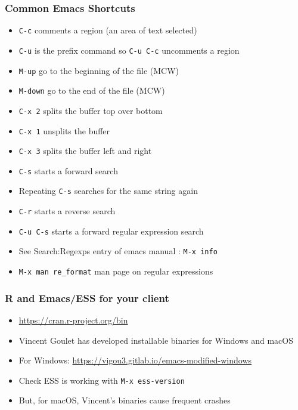\documentclass[11pt,pdftex,dvipsnames,usenames,helvetica]{beamer}
\begin{document}
\begin{frame}
\frametitle{Common Emacs Shortcuts}

\begin{itemize}
\item {\tt C-c} comments a region (an area of text selected)
\item {\tt C-u} is the prefix command so 
{\tt C-u C-c} uncomments a region
\item {\tt M-up} go to the beginning of the file (MCW)
\item {\tt M-down} go to the end of the file (MCW)
\item {\tt C-x 2} splits the buffer top over bottom
\item {\tt C-x 1} unsplits the buffer
\item {\tt C-x 3} splits the buffer left and right
\item {\tt C-s} starts a forward search
\item Repeating {\tt C-s} searches for the same string again
\item {\tt C-r} starts a reverse search
\item {\tt C-u C-s} starts a forward regular expression search
\item See Search:Regexps entry of emacs manual : {\tt M-x info}
\item {\tt M-x man re\_format} man page on regular expressions
\end{itemize}

\end{frame}

\begin{frame}
\frametitle{R and Emacs/ESS for your client}

\begin{itemize}
\item \textcolor{blue}{\url{https://cran.r-project.org/bin}}
\item Vincent Goulet has developed installable binaries
for Windows and macOS
\item For Windows: \url{https://vigou3.gitlab.io/emacs-modified-windows}
\item Check ESS is working with {\tt M-x ess-version}
\item But, for macOS, Vincent's binaries cause
frequent crashes 
\end{itemize}

\end{frame}
\end{document}
